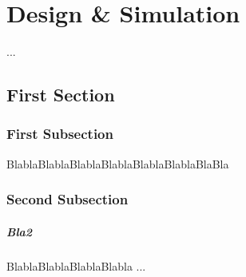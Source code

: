 %

\chapter{Design \& Simulation}
\label{Ch:DesignSimulation}	

...

%
%



\section{First Section }

\subsection{First Subsection}
\label{subsec:DesignA}

BlablaBlablaBlablaBlablaBlablaBlablaBlaBla

%
%



\subsection{Second Subsection}

\paragraph{Bla2} 
BlablaBlablaBlablaBlabla ... 


